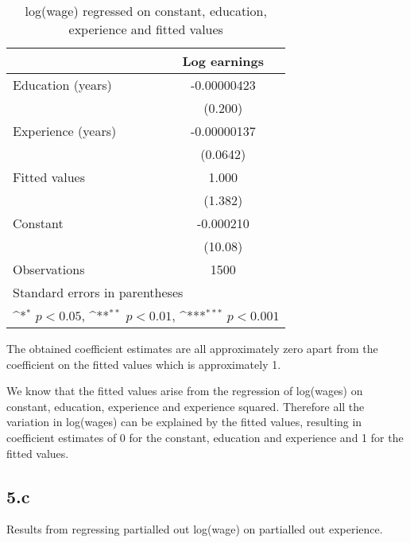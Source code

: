 \documentclass{article}
\begin{document}
\begin{table}[htbp]\centering
\def\sym#1{\ifmmode^{#1}\else\(^{#1}\)\fi}
\caption{log(wage) regressed on constant, education, experience and fitted values}
\begin{tabular}{l*{1}{c}}
\hline\hline
                    &\multicolumn{1}{c}{Log earnings}\\
\hline
Education (years)   & -0.00000423         \\
                    &     (0.200)         \\
[1em]
Experience (years)  & -0.00000137         \\
                    &    (0.0642)         \\
[1em]
Fitted values       &       1.000         \\
                    &     (1.382)         \\
[1em]
Constant            &   -0.000210         \\
                    &     (10.08)         \\
\hline
Observations        &        1500         \\
\hline\hline
\multicolumn{2}{l}{\footnotesize Standard errors in parentheses}\\
\multicolumn{2}{l}{\footnotesize \sym{*} \(p<0.05\), \sym{**} \(p<0.01\), \sym{***} \(p<0.001\)}\\
\end{tabular}
\end{table}

The obtained coefficient estimates are all approximately zero apart from the coefficient on the fitted values which is approximately 1.

We know that the fitted values arise from the regression of log(wages) on constant, education, experience and experience squared. Therefore all the variation in log(wages) can be explained by the fitted values, resulting in coefficient estimates of 0 for the constant, education and experience and 1 for the fitted values.

\clearpage
\subsection*{5.c}

Results from regressing partialled out log(wage) on partialled out experience.
\end{document}
